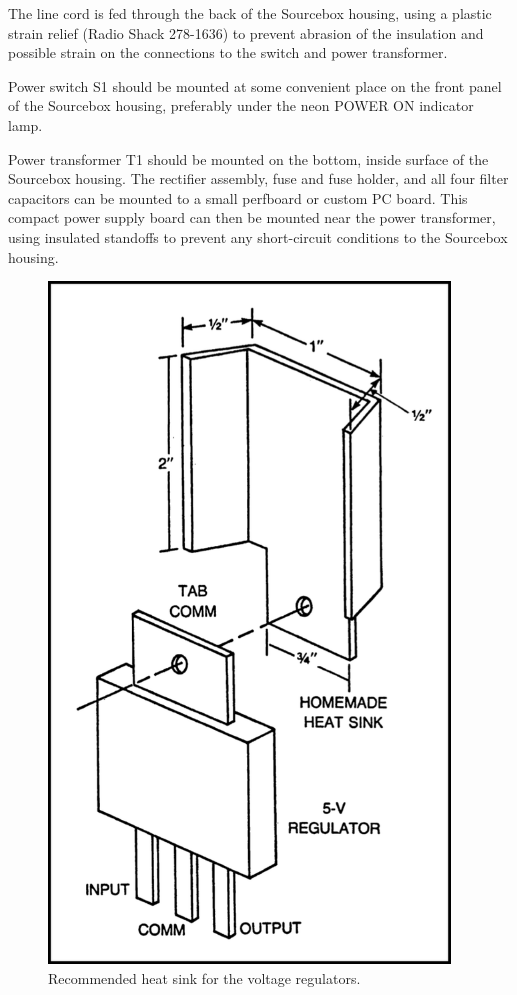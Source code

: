 \documentclass[11pt]{book}              %
\begin{document}
The line cord is fed through the back of the Sourcebox housing, using a plastic strain relief (Radio Shack 278-1636) to prevent abrasion of the insulation and possible strain on the connections to the switch and power transformer.

Power switch S1 should be mounted at some convenient place on the front panel of the Sourcebox housing, preferably under the neon POWER ON indicator lamp.

Power transformer T1 should be mounted on the bottom, inside surface of the Sourcebox housing. The rectifier assembly, fuse and fuse holder, and all four filter capacitors can be mounted to a small perfboard or custom PC board. This compact power supply board can then be mounted near the power transformer, using insulated standoffs to prevent any short-circuit conditions to the Sourcebox housing.

\begin{figure}
  \centering
  \includegraphics[width=0.95\textwidth]{images/fig2-3}
  \caption{Recommended heat sink for the voltage regulators.}
\end{figure}
\end{document}
